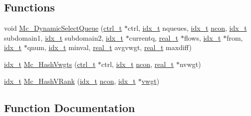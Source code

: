 \subsection*{Functions}
\begin{DoxyCompactItemize}
\item 
void \hyperlink{a00404_aeeb2d9296e2305bdf67b62ba868ad55b}{Mc\+\_\+\+Dynamic\+Select\+Queue} (\hyperlink{a00742}{ctrl\+\_\+t} $\ast$ctrl, \hyperlink{a00876_aaa5262be3e700770163401acb0150f52}{idx\+\_\+t} nqueues, \hyperlink{a00876_aaa5262be3e700770163401acb0150f52}{idx\+\_\+t} \hyperlink{a00879_ac1dd31740e8f97fb57dc917ded30253f}{ncon}, \hyperlink{a00876_aaa5262be3e700770163401acb0150f52}{idx\+\_\+t} subdomain1, \hyperlink{a00876_aaa5262be3e700770163401acb0150f52}{idx\+\_\+t} subdomain2, \hyperlink{a00876_aaa5262be3e700770163401acb0150f52}{idx\+\_\+t} $\ast$currentq, \hyperlink{a00876_a1924a4f6907cc3833213aba1f07fcbe9}{real\+\_\+t} $\ast$flows, \hyperlink{a00876_aaa5262be3e700770163401acb0150f52}{idx\+\_\+t} $\ast$from, \hyperlink{a00876_aaa5262be3e700770163401acb0150f52}{idx\+\_\+t} $\ast$qnum, \hyperlink{a00876_aaa5262be3e700770163401acb0150f52}{idx\+\_\+t} minval, \hyperlink{a00876_a1924a4f6907cc3833213aba1f07fcbe9}{real\+\_\+t} avgvwgt, \hyperlink{a00876_a1924a4f6907cc3833213aba1f07fcbe9}{real\+\_\+t} maxdiff)
\item 
\hyperlink{a00876_aaa5262be3e700770163401acb0150f52}{idx\+\_\+t} \hyperlink{a00404_ab26a17f837c7eb837a18fc921021e586}{Mc\+\_\+\+Hash\+Vwgts} (\hyperlink{a00742}{ctrl\+\_\+t} $\ast$ctrl, \hyperlink{a00876_aaa5262be3e700770163401acb0150f52}{idx\+\_\+t} \hyperlink{a00879_ac1dd31740e8f97fb57dc917ded30253f}{ncon}, \hyperlink{a00876_a1924a4f6907cc3833213aba1f07fcbe9}{real\+\_\+t} $\ast$nvwgt)
\item 
\hyperlink{a00876_aaa5262be3e700770163401acb0150f52}{idx\+\_\+t} \hyperlink{a00404_a626dd91f1c7a272128a4e825fa72cf18}{Mc\+\_\+\+Hash\+V\+Rank} (\hyperlink{a00876_aaa5262be3e700770163401acb0150f52}{idx\+\_\+t} \hyperlink{a00879_ac1dd31740e8f97fb57dc917ded30253f}{ncon}, \hyperlink{a00876_aaa5262be3e700770163401acb0150f52}{idx\+\_\+t} $\ast$\hyperlink{a00879_a34203f1160d94eca83e95f2718ea3504}{vwgt})
\end{DoxyCompactItemize}


\subsection{Function Documentation}
\mbox{\label{a00404_aeeb2d9296e2305bdf67b62ba868ad55b}} 
